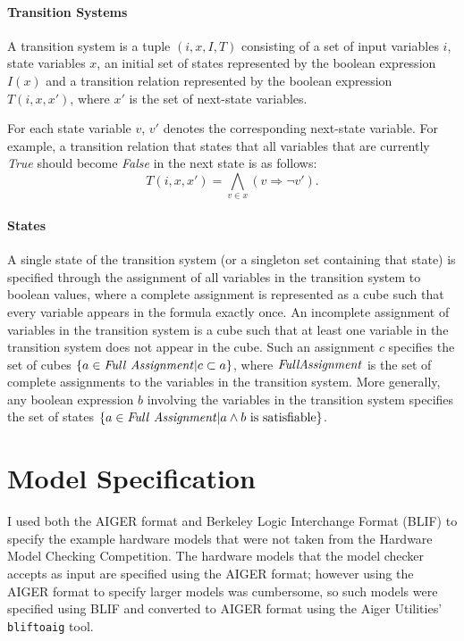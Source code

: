 \documentclass[12pt,a4paper,twoside,openright]{report}
\begin{document}
\paragraph{Transition Systems}{
A transition system is a tuple $(i,x,I,T)$ consisting of a set of input
variables $i$, state variables $x$, an initial
set of states represented by the boolean expression $I(x)$ and
a transition relation represented by the boolean expression $T(i,x,x')$,
where $x'$ is the set of next-state variables.

For each state variable $v$, $v'$ denotes the corresponding next-state variable.
For example, a transition relation that states that all variables that are
currently {\it True} should become {\it False} in the next state is as follows:
$$T(i,x,x') = \bigwedge_{v \in x} (v \Rightarrow \neg v').$$}

\paragraph{States}{
A single state of the transition system (or a singleton set containing that state)
is specified through the assignment of all variables in the transition system
to boolean values, where a complete assignment is represented as a cube such
that every variable appears in the formula exactly once.
An incomplete assignment of variables in the transition system is a cube such that
at least one variable in the transition system does not appear in the cube. Such an
assignment $c$ specifies the set of cubes $\{a \in{\it Full~Assignment}|c \subset a\}$,
where ${\it Full Assignment}$ is the set of complete assignments to the variables in the
transition system.
More generally, any boolean expression $b$ involving the variables in the transition
system specifies the set of states
$\{a \in {\it Full~Assignment} | a \wedge b~{\rm is~satisfiable}\}$.}


\section{Model Specification}


I used both the AIGER format and Berkeley Logic Interchange Format (BLIF)
to specify the example hardware models that were not taken from the
Hardware Model Checking Competition.
The hardware models that the model checker accepts as input
are specified using the AIGER format;
however using the AIGER format to specify larger models was cumbersome,
so such models were specified using BLIF and converted to AIGER format
using the Aiger Utilities' \verb,bliftoaig, tool.
\end{document}
